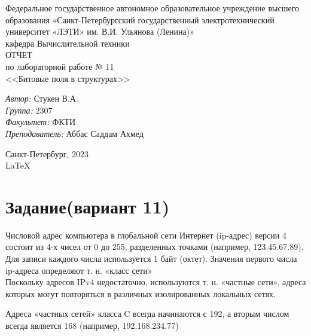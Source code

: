 \documentclass[a4paper,12pt]{report}
\begin{document}
 

\begin{titlepage} 

\begin{center} 

\large Федеральное государственное автономное образовательное учреждение высшего образования «Санкт-Петербургский государственный электротехнический университет «ЛЭТИ» им. В.И. Ульянова (Ленина)»\\
кафедра Вычислительной техники\\[5cm] 

\huge ОТЧЕТ\\ по лабораторной работе № 11\\[0.5cm] 
\large <<Битовые поля в структурах>>\\[3.7cm]

\begin{minipage}{1\textwidth}
    \begin{flushleft}
        \emph{Автор:} Стукен В.А.\\
        \emph{Группа:} 2307\\
        \emph{Факультет:} ФКТИ\\
        \emph{Преподаватель:} Аббас Саддам Ахмед\\
    \end{flushleft}
\end{minipage}

\vfill

Санкт-Петербург, 2023\\
{\large \LaTeX}

\end{center}
\thispagestyle{empty}
\end{titlepage}

\section*{Задание(вариант 11)}

Числовой адрес компьютера в глобальной сети Интернет (ip-адрес) версии 4 состоит из 4-х чисел от 0 до 255, разделенных точками (например, 123.45.67.89). Для записи каждого числа используется 1 байт (октет). Значения первого числа ip-адреса определяют т. н. «класс сети»\\ 

Поскольку адресов IPv4 недостаточно, используются т. н. «частные сети», адреса которых могут повторяться в различных изолированных локальных сетях.

Адреса «частных сетей» класса C всегда начинаются с 192, а вторым числом всегда является 168 (например, 192.168.234.77)
\end{document}
